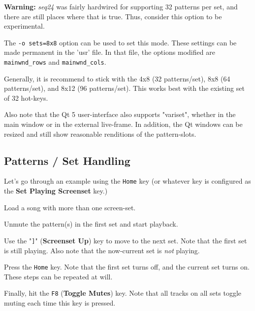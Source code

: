    \textbf{Warning:}
   \textsl{seq24} was fairly hardwired for supporting 32 patterns per
   set, and there are still places where that is true.  Thus,
   consider this option to be experimental.

   The \texttt{-o sets=8x8} option can be used to set this mode.
   These settings can be made permanent in the 'usr' file.
   In that file, the options modified are \texttt{mainwnd\_rows} and
   \texttt{mainwnd\_cols}.

   Generally, it is recommend to stick with the 4x8 (32 patterns/set),
   8x8 (64 patterns/set), and 8x12 (96 patterns/set).  This works best with the
   existing set of 32 hot-keys.

   Also note that the Qt 5 user-interface also supports "variset", whether in
   the main window or in the external live-frame.  In addition, the Qt windows
   can be resized and still show reasonable renditions of the pattern-slots.

\subsection{Patterns / Set Handling}
\label{subsec:patterns_panel_set_handling}

   Let's go through an example using the \texttt{Home} key (or whatever key is
   configured as the \textbf{Set Playing Screenset} key.)

   \begin{enumber}
      \item Load a song with more than one screen-set.
      \item Unmute the pattern(s) in the first set and start playback.
      \item Use the "\texttt{]}" (\textbf{Screenset Up}) key to move to the next
         set.  Note that the first set is still playing.  Also note that the
         now-current set is \textsl{not} playing.
      \item Press the \texttt{Home} key.
         Note that the first set turns off, and the current set turns on.
         These steps can be repeated at will.
      \item Finally, hit the \texttt{F8} (\textbf{Toggle Mutes}) key.
         Note that all tracks on all sets toggle muting each time this key is
         pressed.
   \end{enumber}

